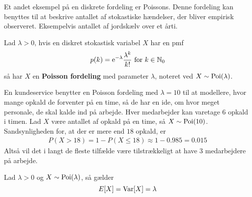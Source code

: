 Et andet eksempel på en diskrete fordeling er Poissons. Denne fordeling kan benyttes til at beskrive antallet af stokastiske hændelser, der bliver empirisk observeret. Eksempelvis antallet af jordskælv over et årti.
\begin{defn}\label{def:poisson}
    Lad $\lambda>0$, hvis en diskret stokastisk variabel $X$ har en pmf
    \begin{align*}
         p(k)=\mathrm{e}^{-\lambda}\frac{\lambda^k}{k!}\text{ for } k\in\mathbb{N}_0
    \end{align*}
    så har $X$ en \textbf{Poisson fordeling} med parameter $\lambda$, noteret ved $X\sim\textnormal{Poi}(\lambda)$.
\end{defn}

\begin{exmp}\label{exmp:kundeservice}
En kundeservice benytter en Poisson fordeling med $\lambda = 10$ til at modellere, hvor mange opkald de forventer på en time, så de har en ide, om hvor meget personale, de skal kalde ind på arbejde. Hver medarbejder kan varetage $6$ opkald i timen. Lad $X$ være antallet af opkald på en time, så $X \sim \textnormal{Poi}(10)$.
Sandsynligheden for, at der er mere end $18$ opkald, er
\begin{align*}
    P(X > 18) = 1 - P(X \leq 18) \approx 1 - 0.985 = 0.015
\end{align*}
Altså vil det i langt de fleste tilfælde være tilstrækkeligt at have 3 medarbejdere på arbejde. 
\end{exmp}
\begin{prop}\label{prop:poiForventedOgVarians} %
Lad $\lambda > 0$ og $X \sim \textnormal{Poi}(\lambda)$, så gælder
\begin{equation*}
    E[X] = \textnormal{Var}[X] = \lambda
\end{equation*}
\end{prop}
